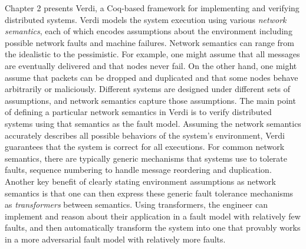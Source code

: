 Chapter 2 presents Verdi, a Coq-based framework for implementing and
verifying distributed systems.  Verdi models the system execution
using various \emph{network semantics}, each of which encodes
assumptions about the environment including possible network faults
and machine failures.  Network semantics can range from the idealistic
to the pessimistic. For example, one might assume that all messages
are eventually delivered and that nodes never fail. On the other hand,
one might assume that packets can be dropped and duplicated and that
some nodes behave arbitrarily or maliciously. Different systems are
designed under different sets of assumptions, and network semantics
capture those assumptions.
The main point of defining a particular network semantics in Verdi is to verify
distributed systems using that semantics as the fault model.
Assuming the network semantics
accurately describes all possible behaviors of the system's
environment, Verdi guarantees that the system is correct for all executions.
For common network semantics, there are typically generic mechanisms
that systems use to tolerate faults, \eg sequence numbering to handle
message reordering and duplication. Another key benefit of clearly
stating environment assumptions as network semantics is that one
can then express these generic fault tolerance mechanisms as \emph{transformers}
between semantics.
Using transformers, the engineer can implement and reason about their
application in a fault model
with relatively few faults, and then automatically transform the system
into one that provably works in a more adversarial fault model with
relatively more faults. 



